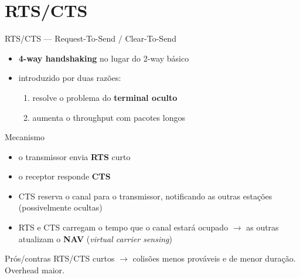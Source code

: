 \documentclass[aspectratio=169,11pt]{beamer}
\begin{document}
\section{RTS/CTS}

\begin{frame}{RTS/CTS --- Request-To-Send / Clear-To-Send}
  \begin{itemize}
    \item \textbf{4-way handshaking} no lugar do 2-way básico
    \item introduzido por duas razões:
      \begin{enumerate}
        \item resolve o problema do \textbf{terminal oculto}
        \item aumenta o throughput com pacotes longos
      \end{enumerate}
  \end{itemize}
  \begin{block}{Mecanismo}
    \begin{itemize}
      \item o transmissor envia \textbf{RTS} curto
      \item o receptor responde \textbf{CTS}
      \item CTS reserva o canal para o transmissor, notificando as outras estações (possivelmente ocultas)
      \item RTS e CTS carregam o tempo que o canal estará ocupado $\rightarrow$ as outras atualizam o \textbf{NAV} (\emph{virtual carrier sensing})
    \end{itemize}
  \end{block}
  \begin{exampleblock}{Prós/contras}
    RTS/CTS curtos $\rightarrow$ colisões menos prováveis e de menor duração. Overhead maior.
  \end{exampleblock}
\end{frame}
\end{document}
